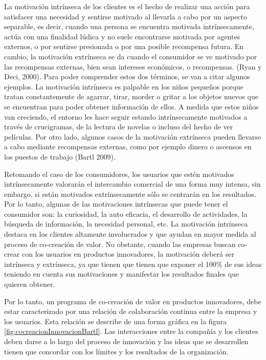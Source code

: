 La motivación intrínseca de los clientes es el hecho de realizar una acción para satisfacer una necesidad y sentirse motivado al llevarla a cabo por un aspecto separable, es decir, cuando una persona se encuentra motivada intrínsecamente, actúa con una finalidad lúdica y no suele encontrarse motivada por agentes externos, o por sentirse presionada o por una posible recompensa futura. En cambio, la motivación extrínseca se da cuando el consumidor se ve motivado por las recompensas externas, bien sean intereses económicos, o recompensas. (Ryan y Deci, 2000). Para poder comprender estos dos términos, se van a citar algunos ejemplos. La motivación intrínseca es palpable en los niños pequeños porque tratan constantemente de agarrar, tirar, morder o gritar a los objetos nuevos que se encuentran para poder obtener información de ellos. A medida que estos niños van creciendo, el entorno les hace seguir estando intrínsecamente motivados a través de crucigramas, de la lectura de novelas o incluso del hecho de ver películas. Por otro lado, algunos casos de la motivación extrínseca pueden llevarse a cabo mediante recompensas externas, como por ejemplo dinero o ascensos en los puestos de trabajo (Bartl 2009).

Retomando el caso de los consumidores, los usuarios que estén motivados intrínsecamente valorarán el intercambio comercial de una forma muy intensa, sin embargo, si están motivados extrínsecamente sólo se centrarán en los resultados. Por lo tanto, algunas de las motivaciones intrínsecas que puede tener el consumidor son: la curiosidad, la auto eficacia, el desarrollo de actividades, la búsqueda de información, la necesidad personal, etc. La motivación intrínseca destaca en los clientes altamente involucrados y que ayudan en mayor medida al proceso de co-creación de valor. No obstante, cuando las empresas buscan co-crear con los usuarios en productos innovadores, la motivación deberá ser intrínseca y extrínseca, ya que tienen que tienen que exponer el 100\% de sus ideas teniendo en cuenta sus motivaciones y manifestar los resultados finales que quieren obtener.

Por lo tanto, un programa de co-creación de valor en productos innovadores, debe estar caracterizado por una relación de colaboración continua entre la empresa y los usuarios. Esta relación se describe de una forma gráfica en la figura \ref{fig:cocreacionInnovacionBartl}. Las interacciones entre la compañía y los clientes deben darse a lo largo del proceso de innovación y las ideas que se desarrollen tienen que concordar con los límites y los resultados de la organización.

